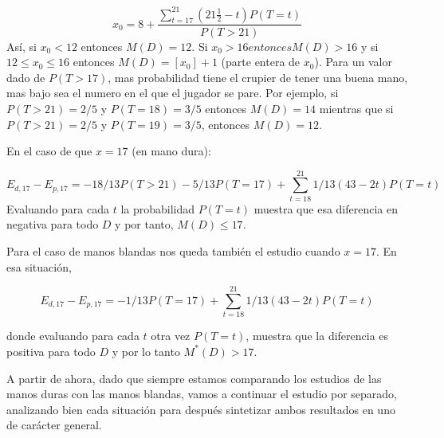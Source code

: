 \documentclass[12pt,a4paper,]{book}
\numberwithin{dummy}{section}
\theoremstyle{ocrenumbox}
\theoremstyle{blacknumex}
\theoremstyle{blacknumbox}
\theoremstyle{ocrenum}
\theoremstyle{ocrenum}
\begin{document}
\[
x_0 = 8+ \frac{\sum_{t=17}^{21}(21 \frac{1}{2}-t)P(T=t)}{P(T>21)}
\] Así, si \(x_0 < 12\) entonces \(M(D)=12\). Si
\(x_0>16 entonces M(D)>16\) y si \(12 \leq x_0 \leq 16\) entonces
\(M(D) = [x_0]+1\) (parte entera de \(x_0\)). Para un valor dado de
\(P(T>17)\), mas probabilidad tiene el crupier de tener una buena mano,
mas bajo sea el numero en el que el jugador se pare. Por ejemplo, si
\(P(T>21)=2/5\) y \(P(T=18)=3/5\) entonces \(M(D)=14\) mientras que si
\(P(T>21)=2/5\) y \(P(T=19)=3/5\), entonces \(M(D)=12\).

En el caso de que \(x=17\) (en mano dura):

\[
E_{d,17}-E_{p,17} = -18/13P(T>21)- 5/13P(T=17)+ \sum_{t=18}^{21}1/13(43-2t)P(T=t)
\] Evaluando para cada \(t\) la probabilidad \(P(T=t)\) muestra que esa
diferencia en negativa para todo \(D\) y por tanto, \(M(D) \leq 17\).

Para el caso de manos blandas nos queda también el estudio cuando
\(x=17\). En esa situación,

\[
E_{d,17}-E_{p,17} = -1/13P(T=17)+ \sum_{t=18}^{21}1/13(43-2t)P(T=t)
\]

donde evaluando para cada \(t\) otra vez \(P(T=t)\), muestra que la
diferencia es positiva para todo \(D\) y por lo tanto \(M^*(D)>17\).

A partir de ahora, dado que siempre estamos comparando los estudios de
las manos duras con las manos blandas, vamos a continuar el estudio por
separado, analizando bien cada situación para después sintetizar ambos
resultados en uno de carácter general.




%
\end{document}

